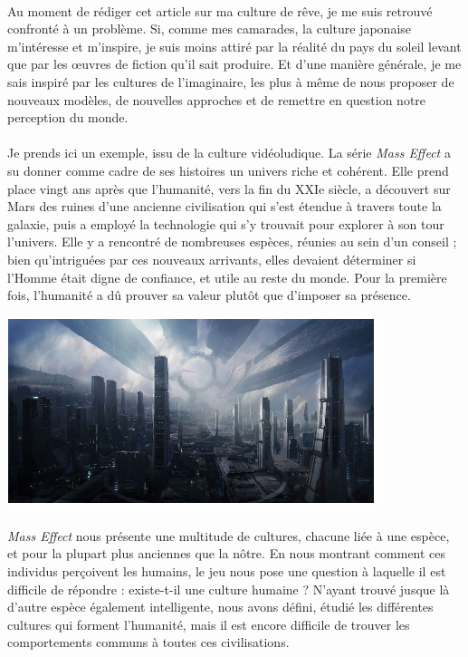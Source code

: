 \paragraph{}
Au moment de rédiger cet article sur ma culture de rêve, je me suis retrouvé confronté à un problème. Si, comme mes camarades, la culture japonaise m’intéresse et m’inspire, je suis moins attiré par la réalité du pays du soleil levant que par les œuvres de fiction qu’il sait produire. Et d’une manière générale, je me sais inspiré par les cultures de l’imaginaire, les plus à même de nous proposer de nouveaux modèles, de nouvelles approches et de remettre en question notre perception du monde.
\paragraph{}
Je prends ici un exemple, issu de la culture vidéoludique. La série \textit{Mass Effect} a su donner comme cadre de ses histoires un univers riche et cohérent. Elle prend place vingt ans après que l’humanité, vers la fin du XXIe siècle, a découvert sur Mars des ruines d’une ancienne civilisation qui s’est étendue à travers toute la galaxie, puis a employé la technologie qui s’y trouvait pour explorer à son tour l’univers. Elle y a rencontré de nombreuses espèces, réunies au sein d’un conseil ; bien qu’intriguées par ces nouveaux arrivants, elles devaient déterminer si l’Homme était digne de confiance, et utile au reste du monde. Pour la première fois, l’humanité a dû prouver sa valeur plutôt que d’imposer sa présence.

\begin{center}
	\includegraphics[scale=1.3]{massEffect1.png}
\end{center}
\paragraph{}
\textit{Mass Effect} nous présente une multitude de cultures, chacune liée à une espèce, et pour la plupart plus anciennes que la nôtre. En nous montrant comment ces individus perçoivent les humains, le jeu nous pose une question à laquelle il est difficile de répondre : existe-t-il une culture humaine ? N’ayant trouvé jusque là d’autre espèce également intelligente, nous avons défini, étudié les différentes cultures qui forment l’humanité, mais il est encore difficile de trouver les comportements communs à toutes ces civilisations.

